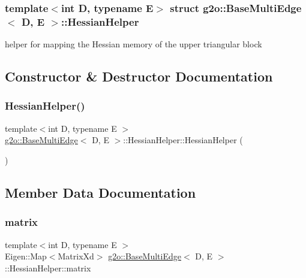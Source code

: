 \subsubsection*{template$<$int D, typename E$>$\newline
struct g2o\+::\+Base\+Multi\+Edge$<$ D, E $>$\+::\+Hessian\+Helper}

helper for mapping the Hessian memory of the upper triangular block 

\subsection{Constructor \& Destructor Documentation}
\mbox{\label{structg2o_1_1_base_multi_edge_1_1_hessian_helper_a5a76a58b21ca39ea6ca1e274b588fad0}} 
\subsubsection{\texorpdfstring{Hessian\+Helper()}{HessianHelper()}}
{\footnotesize\ttfamily template$<$int D, typename E $>$ \\
\mbox{\hyperlink{classg2o_1_1_base_multi_edge}{g2o\+::\+Base\+Multi\+Edge}}$<$ D, E $>$\+::Hessian\+Helper\+::\+Hessian\+Helper (\begin{DoxyParamCaption}{ }\end{DoxyParamCaption})\hspace{0.3cm}{\ttfamily [inline]}}



\subsection{Member Data Documentation}
\mbox{\label{structg2o_1_1_base_multi_edge_1_1_hessian_helper_ab9eab8a9c5bf6e7814173d1955d7a01c}} 
\subsubsection{\texorpdfstring{matrix}{matrix}}
{\footnotesize\ttfamily template$<$int D, typename E $>$ \\
Eigen\+::\+Map$<$Matrix\+Xd$>$ \mbox{\hyperlink{classg2o_1_1_base_multi_edge}{g2o\+::\+Base\+Multi\+Edge}}$<$ D, E $>$\+::Hessian\+Helper\+::matrix}



